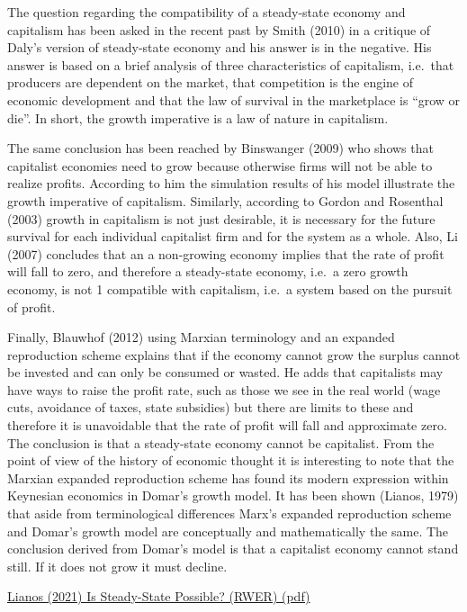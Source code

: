 \documentclass[
]{book}
\begin{document}
The question regarding the compatibility of a steady-state economy and capitalism has been
asked in the recent past by Smith (2010) in a critique of Daly's version of steady-state
economy and his answer is in the negative. His answer is based on a brief analysis of three
characteristics of capitalism, i.e.~that producers are dependent on the market, that competition
is the engine of economic development and that the law of survival in the marketplace is
``grow or die''. In short, the growth imperative is a law of nature in capitalism.

The same conclusion has been reached by Binswanger (2009) who shows that capitalist
economies need to grow because otherwise firms will not be able to realize profits. According
to him the simulation results of his model illustrate the growth imperative of capitalism.
Similarly, according to Gordon and Rosenthal (2003) growth in capitalism is not just desirable,
it is necessary for the future survival for each individual capitalist firm and for the system as a
whole. Also, Li (2007) concludes that an a non-growing economy implies that the rate of profit
will fall to zero, and therefore a steady-state economy, i.e.~a zero growth economy, is not
1
compatible with capitalism, i.e.~a system based on the pursuit of profit.

Finally, Blauwhof (2012) using Marxian terminology and an expanded reproduction scheme
explains that if the economy cannot grow the surplus cannot be invested and can only be
consumed or wasted. He adds that capitalists may have ways to raise the profit rate, such as
those we see in the real world (wage cuts, avoidance of taxes, state subsidies) but there are
limits to these and therefore it is unavoidable that the rate of profit will fall and approximate
zero. The conclusion is that a steady-state economy cannot be capitalist.
From the point of view of the history of economic thought it is interesting to note that the
Marxian expanded reproduction scheme has found its modern expression within Keynesian
economics in Domar's growth model. It has been shown (Lianos, 1979) that aside from
terminological differences Marx's expanded reproduction scheme and Domar's growth model
are conceptually and mathematically the same. The conclusion derived from Domar's model
is that a capitalist economy cannot stand still. If it does not grow it must decline.

\href{pdf/Lianos_2021_Steady-state_possible-RWER95.pdf}{Lianos (2021) Is Steady-State Possible? (RWER) (pdf)}
\end{document}
